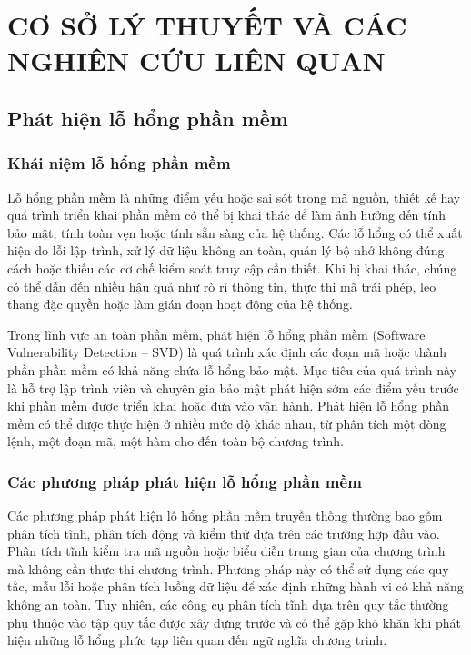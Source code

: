 \chapter{CƠ SỞ LÝ THUYẾT VÀ CÁC NGHIÊN CỨU LIÊN QUAN}

\section{Phát hiện lỗ hổng phần mềm}

\subsection{Khái niệm lỗ hổng phần mềm}

Lỗ hổng phần mềm là những điểm yếu hoặc sai sót trong mã nguồn, thiết kế hay quá trình triển khai
phần mềm có thể bị khai thác để làm ảnh hưởng đến tính bảo mật, tính toàn vẹn hoặc tính sẵn sàng
của hệ thống. Các lỗ hổng có thể xuất hiện do lỗi lập trình, xử lý dữ liệu không an toàn, quản lý
bộ nhớ không đúng cách hoặc thiếu các cơ chế kiểm soát truy cập cần thiết. Khi bị khai thác, chúng
có thể dẫn đến nhiều hậu quả như rò rỉ thông tin, thực thi mã trái phép, leo thang đặc quyền hoặc
làm gián đoạn hoạt động của hệ thống.

Trong lĩnh vực an toàn phần mềm, phát hiện lỗ hổng phần mềm (Software Vulnerability Detection --
SVD) là quá trình xác định các đoạn mã hoặc thành phần phần mềm có khả năng chứa lỗ hổng bảo mật.
Mục tiêu của quá trình này là hỗ trợ lập trình viên và chuyên gia bảo mật phát hiện sớm các điểm
yếu trước khi phần mềm được triển khai hoặc đưa vào vận hành. Phát hiện lỗ hổng phần mềm có thể
được thực hiện ở nhiều mức độ khác nhau, từ phân tích một dòng lệnh, một đoạn mã, một hàm cho đến
toàn bộ chương trình.

\subsection{Các phương pháp phát hiện lỗ hổng phần mềm}

Các phương pháp phát hiện lỗ hổng phần mềm truyền thống thường bao gồm phân tích tĩnh, phân tích
động và kiểm thử dựa trên các trường hợp đầu vào. Phân tích tĩnh kiểm tra mã nguồn hoặc biểu diễn
trung gian của chương trình mà không cần thực thi chương trình. Phương pháp này có thể sử dụng các
quy tắc, mẫu lỗi hoặc phân tích luồng dữ liệu để xác định những hành vi có khả năng không an toàn.
Tuy nhiên, các công cụ phân tích tĩnh dựa trên quy tắc thường phụ thuộc vào tập quy tắc được xây
dựng trước và có thể gặp khó khăn khi phát hiện những lỗ hổng phức tạp liên quan đến ngữ nghĩa
chương trình.

